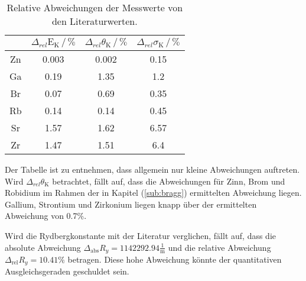 \begin{table}
    \centering
    \caption{Relative Abweichungen der Messwerte von den Literaturwerten.}
    \begin{tabular}{c c c c}
    \toprule
         &  $\Delta_{rel}\text{E}_\text{K} \,/\, \%$ & $\Delta_{rel}\theta_\text{K} \,/\, \% $ & $\Delta_{rel}\sigma_\text{K} \,/\, \% $\\
    \midrule 
      Zn & 0.003& 0.002& 0.15 \\
      Ga & 0.19 & 1.35 & 1.2  \\
      Br & 0.07 & 0.69 & 0.35 \\
      Rb & 0.14 & 0.14 & 0.45 \\
      Sr & 1.57 & 1.62 & 6.57 \\
      Zr & 1.47 & 1.51 & 6.4  \\
    \bottomrule
    \end{tabular}
    \label{tab:disk}
    \end{table}

\noindent
Der Tabelle ist zu entnehmen, dass allgemein nur kleine Abweichungen auftreten.
Wird $\Delta_{rel}\theta_\text{K}$ betrachtet, fällt auf, 
dass die Abweichungen für Zinn, Brom und Robidium im Rahmen der in Kapitel (\ref{sub:bragg}) ermittelten Abweichung liegen.
Gallium, Strontium und Zirkonium liegen knapp über der ermittelten Abweichung von 0.7\%.


\noindent
Wird die Rydbergkonstante mit der Literatur verglichen, fällt auf, dass die absolute Abweichung $\Delta_{\text{abs}} R_y= 1142292.94 \frac{1}{\text{m}}$ und die relative Abweichung $\Delta_{\text{rel}} R_y= 10.41\%$
betragen.
Diese hohe Abweichung könnte der quantitativen Ausgleichsgeraden geschuldet sein.